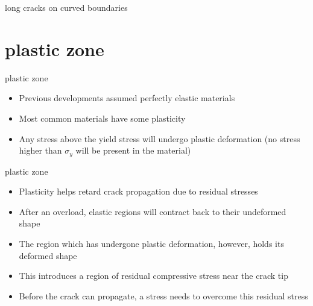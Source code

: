 \documentclass[10pt,handout]{beamer}
\begin{document}
\begin{frame}{long cracks on curved boundaries}
	\begin{figure}
	\end{figure}
\end{frame}

\section{plastic zone}

\begin{frame}{plastic zone}
	\begin{itemize}
		\item Previous developments assumed perfectly elastic materials
		\item Most common materials have some plasticity
		\item Any stress above the yield stress will undergo plastic deformation (no stress higher than $\sigma_y$ will be present in the material)
	\end{itemize}
\end{frame}

\begin{frame}{plastic zone}
	\begin{itemize}
		\item Plasticity helps retard crack propagation due to residual stresses
		\item After an overload, elastic regions will contract back to their undeformed shape
		\item The region which has undergone plastic deformation, however, holds its deformed shape
		\item This introduces a region of residual compressive stress near the crack tip
		\item Before the crack can propagate, a stress needs to overcome this residual stress
	\end{itemize}
\end{frame}
\end{document}
